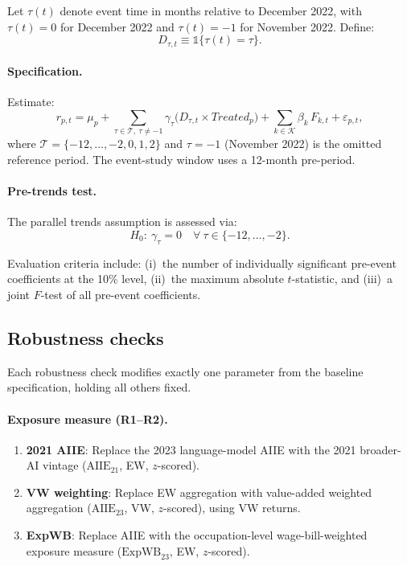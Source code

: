 \documentclass[11pt]{article}
\newcommand{\ind}{\mathbb{1}} %
\begin{document}
Let $\tau(t)$ denote event time in months relative to December 2022, with $\tau(t)=0$ for December 2022 and $\tau(t)=-1$ for November 2022. Define:
\begin{equation}
  D_{\tau,t} \equiv \ind\{\tau(t)=\tau\}.
\end{equation}

\paragraph{Specification.}

Estimate:
\begin{equation}
  r_{p,t}
  =
  \mu_p
  +
  \sum_{\tau \in \mathcal{T},\ \tau \neq -1}
  \gamma_{\tau}\Big(D_{\tau,t} \times Treated_p\Big)
  +
  \sum_{k \in \mathcal{K}}
  \beta_{k}\,F_{k,t}
  +
  \varepsilon_{p,t},
  \label{eq:eventstudy}
\end{equation}
where $\mathcal{T}=\{-12,\ldots,-2,0,1,2\}$ and $\tau=-1$ (November 2022) is the omitted reference period. The event-study window uses a 12-month pre-period.

\paragraph{Pre-trends test.}

The parallel trends assumption is assessed via:
\begin{equation}
  H_0:\ \gamma_{\tau}=0 \quad \forall\ \tau \in \{-12,\ldots,-2\}.
\end{equation}

Evaluation criteria include: (i)~the number of individually significant pre-event coefficients at the 10\% level, (ii)~the maximum absolute $t$-statistic, and (iii)~a joint $F$-test of all pre-event coefficients.

\subsection{Robustness checks}

Each robustness check modifies exactly one parameter from the baseline specification, holding all others fixed.

\paragraph{Exposure measure (R1--R2).}

\begin{enumerate}[label=R\arabic*., leftmargin=*]
  \item \textbf{2021 AIIE}: Replace the 2023 language-model AIIE with the 2021 broader-AI vintage ($\text{AIIE}_{21}$, EW, $z$-scored).
  \item \textbf{VW weighting}: Replace EW aggregation with value-added weighted aggregation ($\text{AIIE}_{23}$, VW, $z$-scored), using VW returns.
  \item[\textbf{R7.}] \textbf{ExpWB}: Replace AIIE with the occupation-level wage-bill-weighted exposure measure ($\text{ExpWB}_{23}$, EW, $z$-scored).
\end{enumerate}
\end{document}
